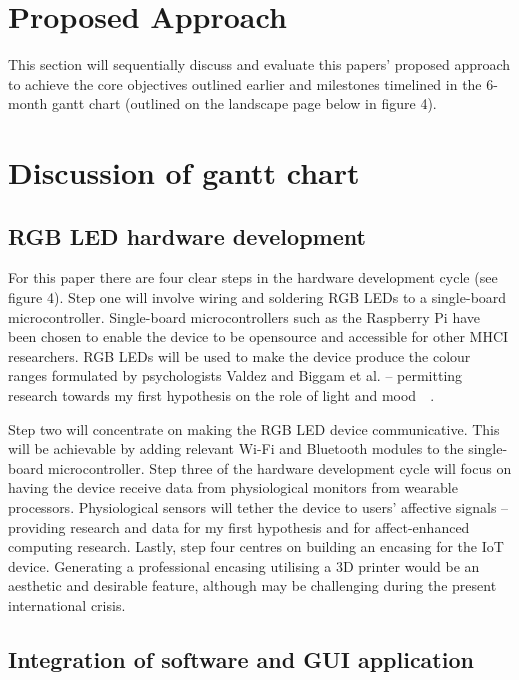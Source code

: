 \documentclass{sigchi}
\begin{document}
\section{Proposed Approach}

This section will sequentially discuss and evaluate this papers’ proposed approach to achieve the core objectives outlined earlier and milestones timelined in the 6-month gantt chart (outlined on the landscape page below in figure 4).

\section{Discussion of gantt chart}
\subsection{RGB LED hardware development}

For this paper there are four clear steps in the hardware development cycle (see figure 4). Step one will involve wiring and soldering RGB LEDs to a single-board microcontroller. Single-board microcontrollers such as the Raspberry Pi have been chosen to enable the device to be opensource and accessible for other MHCI researchers. RGB LEDs will be used to make the device produce the colour ranges formulated by psychologists Valdez and Biggam et al. – permitting research towards my first hypothesis on the role of light and mood~\cite{biggam2006progress}~\cite{valdez1994effects}.

Step two will concentrate on making the RGB LED device communicative. This will be achievable by adding relevant Wi-Fi and Bluetooth modules to the single-board microcontroller. Step three of the hardware development cycle will focus on having the device receive data from physiological monitors from wearable processors. Physiological sensors will tether the device to users’ affective signals – providing research and data for my first hypothesis and for affect-enhanced computing research. Lastly, step four centres on building an encasing for the IoT device. Generating a professional encasing utilising a 3D printer would be an aesthetic and desirable feature, although may be challenging during the present international crisis.

\subsection{Integration of software and GUI application}
\end{document}
